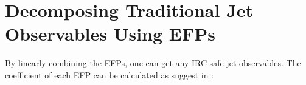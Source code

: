 \documentclass[12pt]{article}
\begin{document}

\section{Decomposing Traditional Jet Observables Using EFPs}
By linearly combining the EFPs, one can get any IRC-safe jet observables. The coefficient of each EFP can be calculated as suggest in \cite{EFP}:
\end{document}
